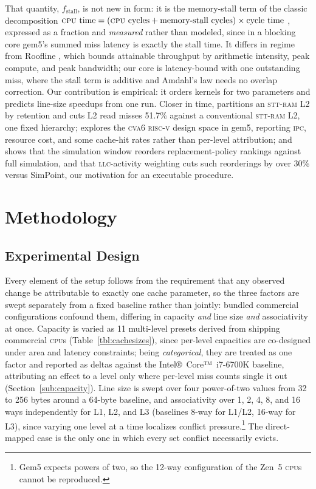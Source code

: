 \documentclass[12pt]{article}
\begin{document}
That quantity, \(f_{\text{stall}}\), is not new in form: it is the memory-stall
term of the classic decomposition \(\text{\textsc{cpu} time} =
(\text{\textsc{cpu} cycles} + \text{memory-stall cycles}) \times \text{cycle
time}\) \cite[App.~B]{hennessy:2017}, expressed as a fraction and \textit{measured}
rather than modeled, since in a blocking core gem5's summed miss latency is
exactly the stall time. It differs in regime from Roofline \cite{williams:2009},
which bounds attainable throughput by arithmetic intensity, peak compute, and
peak bandwidth; our core is latency-bound with one outstanding miss, where the
stall term is additive and Amdahl's law needs no overlap correction. Our
contribution is empirical: it orders kernels for two parameters and predicts
line-size speedups from one run. Closer in time,
\cite{khoshavi:2018} partitions an \textsc{stt-ram} L2 by retention and cuts L2
read misses 51.7\% against a conventional \textsc{stt-ram} L2, one fixed
hierarchy; \cite{shahid:2025} explores the \textsc{cva6} \textsc{risc-v} design
space in gem5, reporting \textsc{ipc}, resource cost, and some cache-hit rates
rather than per-level attribution; and \cite{bueno:2024} shows that the
simulation window reorders replacement-policy rankings against full simulation,
and that \textsc{llc}-activity weighting cuts such reorderings by over 30\%
versus SimPoint, our motivation for an executable procedure.

\section{Methodology}\label{sec:methodology}
\subsection{Experimental Design}\label{sub:rationale}

Every element of the setup follows from the requirement that any observed change
be attributable to exactly one cache parameter, so the three factors are swept
separately from a fixed baseline rather than jointly: bundled commercial
configurations confound them, differing in capacity \textit{and} line size
\textit{and} associativity at once. Capacity is varied as 11 multi-level presets
derived from shipping commercial \textsc{cpu}s (Table~\ref{tbl:cachesizes}),
since per-level capacities are co-designed under area and latency constraints;
being \textit{categorical}, they are treated as one factor and reported as deltas
against the Intel®~Core™~i7-6700K baseline, attributing an effect to a level
only where per-level miss counts single it out (Section~\ref{sub:capacity}). Line size is swept over four power-of-two values from 32 to 256
bytes around a 64-byte baseline, and associativity over 1, 2, 4, 8, and 16 ways
independently for L1, L2, and L3 (baselines 8-way for L1/L2, 16-way for L3),
since varying one level at a time localizes conflict pressure.\footnote{Gem5
expects powers of two, so the 12-way configuration of the Zen~5 \textsc{cpu}s
cannot be reproduced.} The direct-mapped case is the only one in which every set
conflict necessarily evicts.
\end{document}
